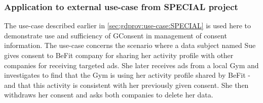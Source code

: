 \subsubsection{Application to external use-case from SPECIAL project}\label{sec:gconsent:use-case:SPECIAL}
The use-case described earlier in \autoref{sec:gdprov:use-case:SPECIAL} is used here to demonstrate use and sufficiency of GConsent in management of consent information. The use-case concerns the scenario where a data subject named Sue gives consent to BeFit company for sharing her activity profile with other companies for receiving targeted ads. She later receives ads from a local Gym and investigates to find that the Gym is using her activity profile shared by BeFit - and that this activity is consistent with her previously given consent. She then withdraws her consent and asks both companies to delete her data.

